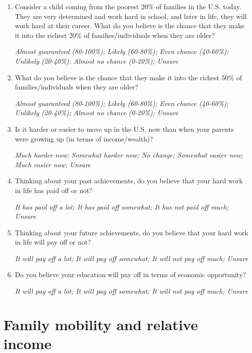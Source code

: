 \documentclass[11pt, headsepline]{article}
\begin{document}
\begin{enumerate}[resume]

    \item Consider a child coming from the poorest 20\% of families in the U.S. today. They are very determined and work hard in school, and later in life, they will work hard at their career. What do you believe is the chance that they make it into the richest 20\% of families/individuals when they are older?

    \textit{Almost guaranteed (80-100\%); Likely (60-80\%); Even chance (40-60\%); Unlikely (20-40\%); Almost no chance (0-20\%); Unsure}

    \item What do you believe is the chance that they make it into the richest 50\% of families/individuals when they are older?

    \textit{Almost guaranteed (80-100\%); Likely (60-80\%); Even chance (40-60\%); Unlikely (20-40\%); Almost no chance (0-20\%); Unsure}

    \item Is it harder or easier to move up in the U.S. now than when your parents were growing up (in terms of income/wealth)?

    \textit{Much harder now; Somewhat harder now; No change; Somewhat easier now; Much easier now; Unsure}

    \item Thinking about your past achievements, do you believe that your hard work in life has paid off or not?

    \textit{It has paid off a lot; It has paid off somewhat; It has not paid off much; Unsure}

    \item Thinking about your future achievements, do you believe that your hard work in life will pay off or not?

    \textit{It will pay off a lot; It will pay off somewhat; It will not pay off much; Unsure}

    \item Do you believe your education will pay off in terms of economic opportunity?

    \textit{It will pay off a lot; It will pay off somewhat; It will not pay off much; Unsure}
    
\end{enumerate}

\section*{Family mobility and relative income}
\end{document}

